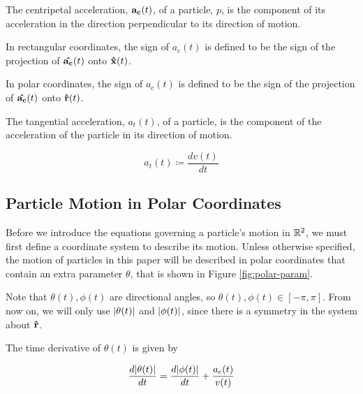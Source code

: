 \begin{definition}
  The centripetal acceleration, $\mathbf{a_c}(t)$, of a particle, $p$, is the component of its acceleration in the direction perpendicular to its direction of motion.

  In rectangular coordinates, the sign of $a_c(t)$ is defined to be the sign of the projection of $\mathbf{\hat{a_c}}(t)$ onto $\mathbf{\hat{x}}(t)$. 

  In polar coordinates, the sign of $a_c(t)$ is defined to be the sign of the projection of $\mathbf{\hat{a_c}}(t)$ onto $\mathbf{\hat{r}}(t)$.
\end{definition}

\begin{definition}
  The tangential acceleration, $a_t(t)$, of a particle, is the component of the acceleration of the particle in its direction of motion.

  \[a_t(t) \coloneqq \frac{dv(t)}{dt}\]
\end{definition}


\subsection{Particle Motion in Polar Coordinates}

Before we introduce the equations governing a particle's motion in $\mathbb R^2$, we must first define a coordinate system to describe its motion. Unless otherwise specified, the motion of particles in this paper will be described in polar coordinates that contain an extra parameter $\theta$, that is shown in Figure \ref{fig:polar-param}.


Note that $\theta(t), \phi(t)$ are directional angles, so $\theta(t), \phi(t) \in [-\pi, \pi]$. From now on, we will only use $\abs{\theta(t)}$ and $\abs{\phi(t)}$, since there is a symmetry in the system about $\mathbf{\hat{r}}$.

\begin{lemma}
The time derivative of $\theta(t)$ is given by

\begin{equation}\label{eq:theta-deriv}
\frac{d\abs{\theta(t)}}{dt} = \frac{d\abs{\phi(t)}}{dt} + \frac{a_c(t)}{v(t)}
\end{equation}

\end{lemma}

